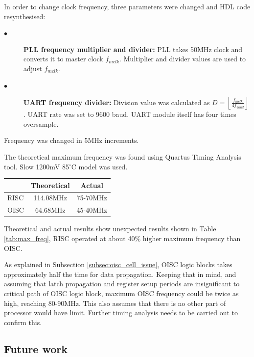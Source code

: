 In order to change clock frequency, three parameters were changed and HDL code resynthesised: 
\begin{description}
	\item[$\bullet$] \textbf{PLL frequency multiplier and divider:}
	PLL takes 50MHz clock and converts it to master clock $f_{mclk}$. Multiplier and divider values are used to adjust $f_{mclk}$.
	
	\item[$\bullet$] \textbf{UART frequency divider:}
	Division value was calculated as $D = \left \lfloor \frac{f_{mclk}}{4 f_{baud}} \right \rfloor$. UART rate was set to 9600 baud. UART module itself has four times oversample. 
\end{description}
Frequency was changed in 5MHz increments. 

The theoretical maximum frequency was found using Quartus Timing Analysis tool. Slow 1200mV 85$^{\circ}$C model was used. 

\begin{center}
	\begin{tabular}{ l | c | c  }
		     & Theoretical & Actual \\ \hline
		RISC & 114.08MHz & 75-70MHz \\ \hline
		OISC & 64.68MHz & 45-40MHz \\
	\end{tabular}
	\label{tab:max_freq}
\end{center}

Theoretical and actual results show unexpected results shown in Table \ref{tab:max_freq}, RISC operated at about 40\% higher maximum frequency than OISC.

As explained in Subsection \ref{subsec:oisc_cell_issue}, OISC logic blocks takes approximately half the time for data propagation. Keeping that in mind, and assuming that latch propagation and register setup periods are insignificant to critical path of OISC logic block, maximum OISC frequency could be twice as high, reaching 80-90MHz. This also assumes that there is no other part of processor would have limit. Further timing analysis needs to be carried out to confirm this.

\subsection{Future work}

